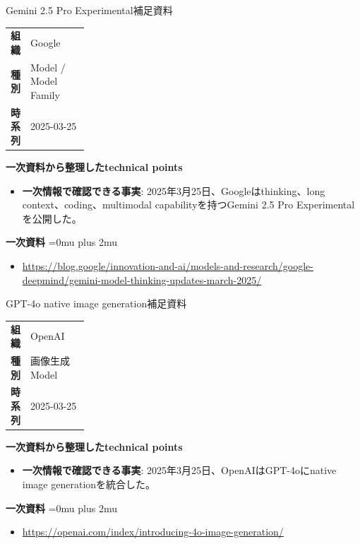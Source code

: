 \begin{technicalnote}{Gemini 2.5 Pro Experimental}{補足資料}
\begingroup
\begin{tabularx}{\linewidth}{@{}>{\bfseries}p{0.22\linewidth}X@{}}
組織 & Google \\
種別 & Model / Model Family \\
時系列 & 2025-03-25 \\
\end{tabularx}
\smallskip
{\bfseries 一次資料から整理したtechnical points}
\begin{itemize}[leftmargin=1.5em,itemsep=0.35em]
\item \textbf{一次情報で確認できる事実}: 2025年3月25日、Googleはthinking、long context、coding、multimodal capabilityを持つGemini 2.5 Pro Experimentalを公開した。
\end{itemize}
\begin{samepage}
{\bfseries 一次資料}
\begingroup\sloppy
\Urlmuskip=0mu plus 2mu\relax
\begin{itemize}[leftmargin=1.5em,itemsep=0.25em]
\item {\scriptsize\url{https://blog.google/innovation-and-ai/models-and-research/google-deepmind/gemini-model-thinking-updates-march-2025/}}
\end{itemize}
\endgroup
\end{samepage}
\endgroup
\end{technicalnote}
\medskip

\begin{technicalnote}{GPT-4o native image generation}{補足資料}
\begingroup
\begin{tabularx}{\linewidth}{@{}>{\bfseries}p{0.22\linewidth}X@{}}
組織 & OpenAI \\
種別 & 画像生成Model \\
時系列 & 2025-03-25 \\
\end{tabularx}
\smallskip
{\bfseries 一次資料から整理したtechnical points}
\begin{itemize}[leftmargin=1.5em,itemsep=0.35em]
\item \textbf{一次情報で確認できる事実}: 2025年3月25日、OpenAIはGPT-4oにnative image generationを統合した。
\end{itemize}
\begin{samepage}
{\bfseries 一次資料}
\begingroup\sloppy
\Urlmuskip=0mu plus 2mu\relax
\begin{itemize}[leftmargin=1.5em,itemsep=0.25em]
\item {\scriptsize\url{https://openai.com/index/introducing-4o-image-generation/}}
\end{itemize}
\endgroup
\end{samepage}
\endgroup
\end{technicalnote}
\medskip


